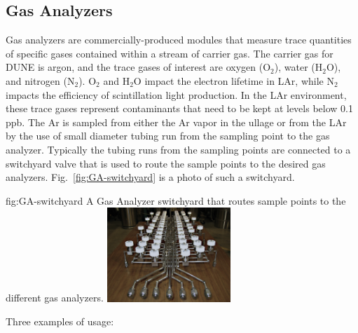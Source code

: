 \subsection{Gas Analyzers}
\label{sec:fdsp-slow-cryo-gas-anlyz}

 Gas analyzers are commercially-produced modules that measure trace quantities of specific gases contained within a stream of carrier gas. The carrier gas for DUNE is argon, and the trace gases of interest are oxygen ($\text{O}_2$), water ($\text{H}_2\text{O}$), and nitrogen ($\text{N}_2$). $\text{O}_2$ and $\text{H}_2\text{O}$ impact the electron lifetime in LAr, while $\text{N}_2$ impacts the efficiency of scintillation light production. In the LAr environment, these trace gases represent contaminants that need to be kept at levels below 0.1 ppb.
The Ar is sampled from either the Ar vapor in the ullage or from the LAr by the use of small diameter tubing run from the sampling point to the gas analyzer. Typically the tubing runs from the sampling points are connected to a switchyard valve that is used to route the sample points to the desired gas analyzers. Fig.~\ref{fig:GA-switchyard} is a photo of such a switchyard.

\begin{dunefigure}{fig:GA-switchyard}
  {A Gas Analyzer switchyard that routes sample points to the different gas analyzers.}
  \includegraphics[width=0.35\textwidth]{figures/GasAnalyzerSwitchyard.png}%
\end{dunefigure}

Three examples of usage:

